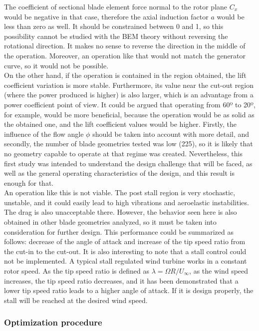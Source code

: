 \documentclass[../TFG_Report.tex]{subfiles}
\begin{document}
The coefficient of sectional blade element force normal to the rotor plane $C_x$ would be negative in that case, therefore the axial induction factor $a$ would be less than zero as well. It should be constrained between 0 and 1, so this possibility cannot be studied with the BEM theory without reversing the rotational direction. It makes no sense to reverse the direction in the middle of the operation. Moreover, an operation like that would not match the generator curve, so it would not be possible.   \\

On the other hand, if the operation is contained in the region obtained, the lift coefficient variation is more stable. Furthermore, its value near the cut-out region (where the power produced is higher) is also larger, which is an advantage from a power coefficient point of view. It could be argued that operating from 60º to 20º, for example, would be more beneficial, because the operation would be as solid as the obtained one, and the lift coefficient values would be higher. Firstly, the influence of the flow angle $\phi$ should be taken into account with more detail, and secondly, the number of blade geometries tested was low (225), so it is likely that no geometry capable to operate at that regime was created. Nevertheless, this first study was intended to understand the design challenge that will be faced, as well as the general operating characteristics of the design, and this result is enough for that. \\

An operation like this is not viable. The post stall region is very stochastic, unstable, and it could easily lead to high vibrations and aeroelastic instabilities. The drag is also unacceptable there. However, the behavior seen here is also obtained in other blade geometries analyzed, so it must be taken into consideration for further design. This performance could be summarized as follows: decrease of the angle of attack and increase of the tip speed ratio from the cut-in to the cut-out. It is also interesting to note that a stall control could not be implemented. A typical stall regulated wind turbine works in a constant rotor speed. As the tip speed ratio is defined as $\lambda = \Omega R / U_{\infty}$, as the wind speed increases, the tip speed ratio decreases, and it has been demonstrated that a lower tip speed ratio leads to a higher angle of attack. If it is design properly, the stall will be reached at the desired wind speed. 








\subsubsection{Optimization procedure}









	
	



	
\end{document}
